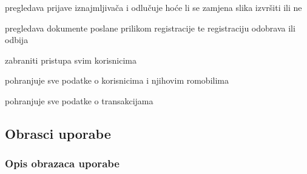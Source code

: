 \begin{packed_enum}
\begin{packed_enum}
				\end{packed_enum}

				\item  {}
				
				\begin{packed_enum}
					
					\item pregledava prijave iznajmljivača i odlučuje hoće li se zamjena slika izvršiti ili ne
					\item pregledava dokumente poslane prilikom registracije te registraciju odobrava ili odbija
					\item zabraniti pristupa svim korisnicima

				\end{packed_enum}

				\item  {}
				
				\begin{packed_enum}
					
					\item pohranjuje sve podatke o korisnicima i njihovim romobilima
					\item pohranjuje sve podatke o transakcijama

				\end{packed_enum}
			\end{packed_enum}
			
			\eject 
			
			
				
			\subsection{Obrasci uporabe}

				
				\subsubsection{Opis obrazaca uporabe}

					

